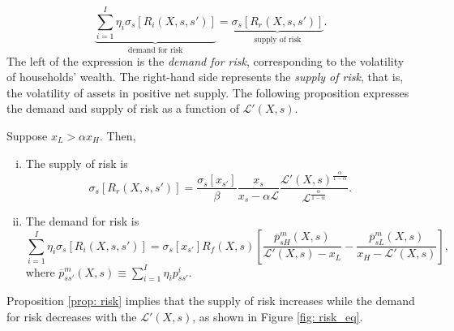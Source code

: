 \begin{equation*}
    \underbrace{\sum_{i=1}^I \eta_i \sigma_s[R_{i}(X,s,s')]}_{\text{demand for risk}} =  \underbrace{\sigma_s[R_r(X,s,s')]}_{\text{supply of risk}}.
\end{equation*}
The left of the expression is the \textit{demand for risk}, corresponding to the volatility of households' wealth. 
The right-hand side represents the \textit{supply of risk}, that is, the volatility of assets in positive net supply.
The following proposition expresses the demand and supply of risk as a function of $\mathcal{L}'(X,s)$.
\begin{proposition} \label{prop: risk} Suppose $x_L > \alpha x_H $. Then,
\begin{enumerate}[(i)]
    \item The supply of risk is
    \begin{equation}
        \sigma_s[R_r(X,s,s')] = \frac{\sigma_s[x_{s'}] }{\beta} \frac{x_s}{x_{s} - \alpha \mathcal{L} } \frac{\mathcal{L}'(X,s)^\frac{\alpha}{1-\alpha}}{\mathcal{L}^\frac{\alpha}{1-\alpha} }.
    \end{equation}
    \item The demand for risk is
    \begin{equation}
        \sum_{i=1}^I \eta_i \sigma_s[R_{i}(X,s,s')] =  \sigma_s[x_{s'}] R_f(X,s) \left[\frac{\overline{p}^m_{sH}(X,s)}{\mathcal{L}'(X,s) - x_L}  -\frac{\overline{p}^m_{sL}(X,s)}{x_H-\mathcal{L}'(X,s)} \right],
    \end{equation}
    where $\overline{p}_{ss'}^{m}(X,s) \equiv \sum_{i=1}^I \eta_i p_{ss'}^i$.
\end{enumerate}

\end{proposition}
Proposition \ref{prop: risk} implies that the supply of risk increases while the demand for risk decreases with the $\mathcal{L}'(X,s)$, as shown in Figure \ref{fig: risk_eq}. 
